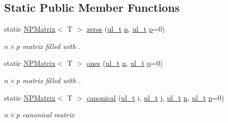 \subsection*{Static Public Member Functions}
\begin{DoxyCompactItemize}
\item 
static \mbox{\hyperlink{class_n_p_matrix}{N\+P\+Matrix}}$<$ T $>$ \mbox{\hyperlink{class_n_p_matrix_a701c8f60b4b8b727fccb063cd6f0784b}{zeros}} (\mbox{\hyperlink{group___n_algebra_ga1b140a2034db3f5dfe18a987745df43a}{ul\+\_\+t}} \mbox{\hyperlink{class_n_p_matrix_afc181b7652d9427125c72c38d7c1498d}{n}}, \mbox{\hyperlink{group___n_algebra_ga1b140a2034db3f5dfe18a987745df43a}{ul\+\_\+t}} \mbox{\hyperlink{class_n_p_matrix_a3beee8acb5babf62d2b4f212ac5d18e8}{p}}=0)
\begin{DoxyCompactList}\small\item\em $ n \times p $ matrix filled with {}. \end{DoxyCompactList}\item 
static \mbox{\hyperlink{class_n_p_matrix}{N\+P\+Matrix}}$<$ T $>$ \mbox{\hyperlink{class_n_p_matrix_a6509ca1d29b8b87f2d437883f48a40c9}{ones}} (\mbox{\hyperlink{group___n_algebra_ga1b140a2034db3f5dfe18a987745df43a}{ul\+\_\+t}} \mbox{\hyperlink{class_n_p_matrix_afc181b7652d9427125c72c38d7c1498d}{n}}, \mbox{\hyperlink{group___n_algebra_ga1b140a2034db3f5dfe18a987745df43a}{ul\+\_\+t}} \mbox{\hyperlink{class_n_p_matrix_a3beee8acb5babf62d2b4f212ac5d18e8}{p}}=0)
\begin{DoxyCompactList}\small\item\em $ n \times p $ matrix filled with {}. \end{DoxyCompactList}\item 
static \mbox{\hyperlink{class_n_p_matrix}{N\+P\+Matrix}}$<$ T $>$ \mbox{\hyperlink{class_n_p_matrix_abda10c35b77af6785cb5cf069ff099e7}{canonical}} (\mbox{\hyperlink{group___n_algebra_ga1b140a2034db3f5dfe18a987745df43a}{ul\+\_\+t}} i, \mbox{\hyperlink{group___n_algebra_ga1b140a2034db3f5dfe18a987745df43a}{ul\+\_\+t}} j, \mbox{\hyperlink{group___n_algebra_ga1b140a2034db3f5dfe18a987745df43a}{ul\+\_\+t}} \mbox{\hyperlink{class_n_p_matrix_afc181b7652d9427125c72c38d7c1498d}{n}}, \mbox{\hyperlink{group___n_algebra_ga1b140a2034db3f5dfe18a987745df43a}{ul\+\_\+t}} \mbox{\hyperlink{class_n_p_matrix_a3beee8acb5babf62d2b4f212ac5d18e8}{p}}=0)
\begin{DoxyCompactList}\small\item\em $ n \times p $ canonical matrix \end{DoxyCompactList}\item 

\end{DoxyCompactItemize}
